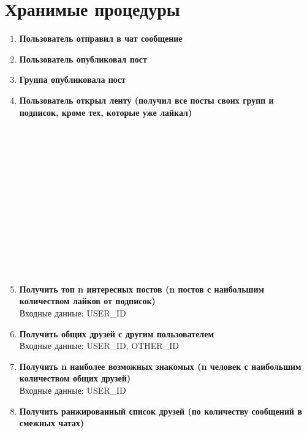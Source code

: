 \documentclass[12pt, a4paper] {ncc}
\begin{document}
\section{Хранимые процедуры}
\begin{enumerate}
\item \textbf{Пользователь отправил в чат сообщение} \\

\item \textbf{Пользователь опубликовал пост} \\

\item \textbf{Группа опубликовала пост} \\

\item \textbf{Пользователь открыл ленту (получил все посты своих групп и подписок, кроме тех, которые уже лайкал)} \\
\\\\\\\\\\\\\\\\\\\\\\\\\\

\item \textbf{Получить топ n интересных постов (n постов с наибольшим количеством лайков от подписок)} \\
Входные данные: USER\_ID

\item \textbf{Получить общих друзей с другим пользователем} \\
Входные данные: USER\_ID, OTHER\_ID

\item \textbf{Получить n наиболее возможных знакомых (n человек с наибольшим количеством общих друзей)} \\
Входные данные: USER\_ID \\

\item \textbf{Получить ранжированный список друзей (по количеству сообщений в смежных чатах)} \\

\end{enumerate}
\end{document}
